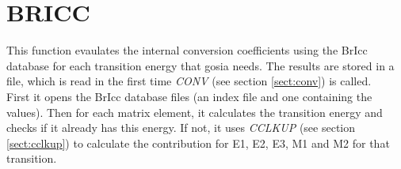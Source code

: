 \section{BRICC}
\label{sect:bricc}

\noindent This function evaulates the internal conversion coefficients
using the BrIcc database for each transition energy that gosia needs.
The results are stored in a file, which is read in the first time {\em
CONV} (see section \ref{sect:conv}) is called.\\

\noindent First it opens the BrIcc database files (an index file and
one containing the values). Then for each matrix element, it
calculates the transition energy and checks if it already has this
energy. If not, it uses {\em CCLKUP} (see section \ref{sect:cclkup})
to calculate the contribution for E1, E2, E3, M1 and M2 for that
transition.\\
